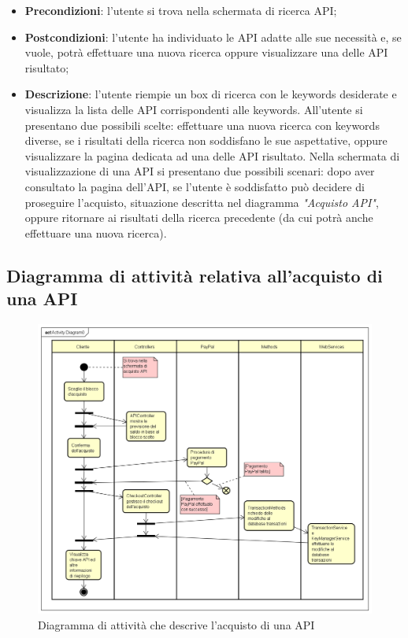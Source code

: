 \begin{itemize}
	\item \textbf{Precondizioni}: l'utente si trova nella schermata di ricerca API;
	\item \textbf{Postcondizioni}: l'utente ha individuato le API adatte alle sue necessità e, se vuole, potrà effettuare una nuova ricerca oppure visualizzare una delle API risultato;
	\item \textbf{Descrizione}: l'utente riempie un box di ricerca con le keywords desiderate e visualizza la lista delle API corrispondenti alle keywords. All'utente si presentano due possibili scelte: effettuare una nuova ricerca con keywords diverse, se i risultati della ricerca non soddisfano le sue aspettative, oppure visualizzare la pagina dedicata ad una delle API risultato. Nella schermata di visualizzazione di una API si presentano due possibili scenari: dopo aver consultato la pagina dell'API, se l'utente è soddisfatto può decidere di proseguire l'acquisto, situazione descritta nel diagramma \textit{"Acquisto API"}, oppure ritornare ai risultati della ricerca precedente (da cui potrà anche effettuare una nuova ricerca).
\end{itemize}

\newpage
\subsection{Diagramma di attività relativa all'acquisto di una API}
\begin{figure}[h]
	\centering
	\includegraphics[width=1.0\linewidth]{IMG/att_Acquisto_API}
	\caption{Diagramma di attività che descrive l'acquisto di una API}
	\label{fig:acquistoapi}
\end{figure}

